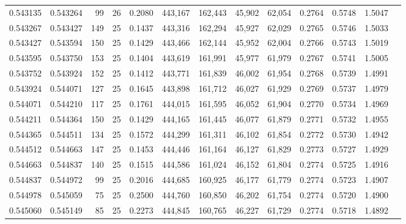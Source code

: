 \begin{tabular}{rrrrrrrrrrrrr}
0.543135 & 0.543264 &    99 &  26 &                                     0.2080 & 443,167 & 162,443 &  45,902 &  62,054 & 0.2764 & 0.5748 & 1.5047 \\
0.543267 & 0.543427 &   149 &  25 &                                     0.1437 & 443,316 & 162,294 &  45,927 &  62,029 & 0.2765 & 0.5746 & 1.5033 \\
0.543427 & 0.543594 &   150 &  25 &                                     0.1429 & 443,466 & 162,144 &  45,952 &  62,004 & 0.2766 & 0.5743 & 1.5019 \\
0.543595 & 0.543750 &   153 &  25 &                                     0.1404 & 443,619 & 161,991 &  45,977 &  61,979 & 0.2767 & 0.5741 & 1.5005 \\
0.543752 & 0.543924 &   152 &  25 &                                     0.1412 & 443,771 & 161,839 &  46,002 &  61,954 & 0.2768 & 0.5739 & 1.4991 \\
0.543924 & 0.544071 &   127 &  25 &                                     0.1645 & 443,898 & 161,712 &  46,027 &  61,929 & 0.2769 & 0.5737 & 1.4979 \\
0.544071 & 0.544210 &   117 &  25 &                                     0.1761 & 444,015 & 161,595 &  46,052 &  61,904 & 0.2770 & 0.5734 & 1.4969 \\
0.544211 & 0.544364 &   150 &  25 &                                     0.1429 & 444,165 & 161,445 &  46,077 &  61,879 & 0.2771 & 0.5732 & 1.4955 \\
0.544365 & 0.544511 &   134 &  25 &                                     0.1572 & 444,299 & 161,311 &  46,102 &  61,854 & 0.2772 & 0.5730 & 1.4942 \\
0.544512 & 0.544663 &   147 &  25 &                                     0.1453 & 444,446 & 161,164 &  46,127 &  61,829 & 0.2773 & 0.5727 & 1.4929 \\
0.544663 & 0.544837 &   140 &  25 &                                     0.1515 & 444,586 & 161,024 &  46,152 &  61,804 & 0.2774 & 0.5725 & 1.4916 \\
0.544837 & 0.544972 &    99 &  25 &                                     0.2016 & 444,685 & 160,925 &  46,177 &  61,779 & 0.2774 & 0.5723 & 1.4907 \\
0.544978 & 0.545059 &    75 &  25 &                                     0.2500 & 444,760 & 160,850 &  46,202 &  61,754 & 0.2774 & 0.5720 & 1.4900 \\
0.545060 & 0.545149 &    85 &  25 &                                     0.2273 & 444,845 & 160,765 &  46,227 &  61,729 & 0.2774 & 0.5718 & 1.4892 \\

\end{tabular}
